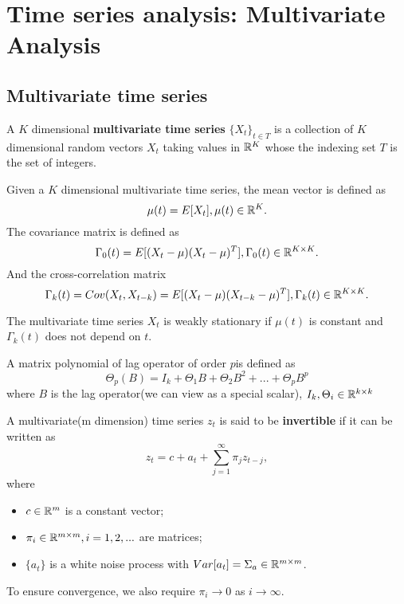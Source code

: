 \printbibliography

\chapter{Time series analysis: Multivariate Analysis}

\section{Multivariate time series}
\begin{definition}
A $K$ dimensional \textbf{multivariate time series }$\{X_t\}_{t\in T}$ is a collection of $K$ dimensional random vectors $X_t$ taking values in $\mathbb{R}^K$ whose the indexing set $T$ is the set of integers.
\end{definition}


\begin{definition}
Given a $K$ dimensional multivariate time series, 
the mean vector is defined as
$$\mu(t) = E[X_t],\mu(t)\in \mathbb{R}^K.$$
The covariance matrix is defined as
$$\Gamma_0(t) = E[(X_t - \mu)(X_t - \mu)^T], \Gamma_0(t) \in \mathbb{R}^{K\times K}.$$
And the cross-correlation matrix
$$\Gamma_k(t) = Cov(X_t,X_{t-k}) = E[(X_t - \mu)(X_{t-k} - \mu)^T],\Gamma_k(t) \in \mathbb{R}^{K\times K}.$$
\end{definition}


\begin{definition}
The multivariate time series $X_t$ is weakly stationary if
$\mu(t)$ is constant and $\Gamma_k(t)$ does not depend on $t$.
\end{definition}

\begin{definition}
A matrix polynomial  of lag operator of order $p$is defined as
$$\Theta_p(B) = I_k + \Theta_1B + \Theta_2 B^2 + ... + \Theta_p B^p$$
where $B$ is the lag operator(we can view as a special scalar), $I_k,\Theta_i \in \mathbb{R}^{k\times k}$
\end{definition}


\begin{definition}[invertibility]\cite[7]{tsay2013multivariate}
A multivariate(m dimension) time series $z_t$ is said to be \textbf{invertible} if it can be written as
$$z_t = c + a_t + \sum_{j=1}^\infty \pi_j z_{t-j},$$
where
\begin{itemize}
	\item $c\in \mathbb{R}^m $ is a constant vector;
	\item $\pi_i \in \mathbb{R}^{m\times m}, i=1,2,...$ are matrices;
	\item $\{a_t\}$ is a white noise process with $Var[a_t] = \Sigma_a \in \mathbb{R}^{m\times m}$. 
\end{itemize}

To ensure convergence, we also require $\pi_i\to 0$ as $i\to \infty$.
\end{definition}


